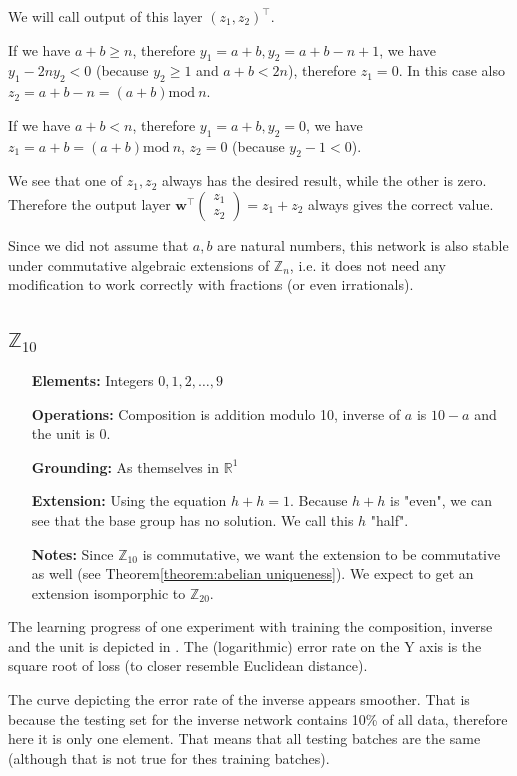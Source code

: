 We will call output of this layer $(z_1,z_2)^\top$. 

If we have $a+b\geq n$, therefore $y_1=a+b, y_2=a+b-n+1$, we have $y_1-2ny_2<0$ (because $y_2\geq 1$ and $a+b<2n$), therefore $z_1=0$. In this case also $z_2=a+b-n=(a+b)\text{mod}\ n$.

If we have $a+b< n$, therefore $y_1=a+b,y_2=0$, we have $z_1=a+b=(a+b)\text{mod}\ n$, $z_2=0$ (because $y_2-1<0$).

We see that one of $z_1,z_2$ always has the desired result, while the other is zero. Therefore the output layer $\textbf{w}^\top \left(\begin{matrix}
z_1\\
z_2
\end{matrix}\right)=z_1+z_2$ always gives the correct value.

Since we did not assume that $a,b$ are natural numbers, this network is also stable under commutative algebraic extensions of $\mathbb{Z}_n$, i.e. it does not need any modification to work correctly with fractions (or even irrationals).
\subsection{$\mathbb{Z}_{10}$}

\begin{itemize}
	\item[\textbf{Elements:}] Integers $0,1,2,\dots,9$
	\item[\textbf{Operations:}] Composition is addition modulo 10, inverse of $a$ is $10-a$ and the unit is 0.
	\item[\textbf{Grounding:}] As themselves in $\mathbb{R}^1$
	\item[\textbf{Extension:}] Using the equation $h+h=1$. Because $h+h$ is "even", we can see that the base group has no solution. We call this $h$ "half".
	\item[\textbf{Notes:}] Since $\mathbb{Z}_{10}$ is commutative, we want the extension to be commutative as well (see Theorem\autoref{theorem:abelian uniqueness}). We expect to get an extension isomporphic to $\mathbb{Z}_{20}$.
\end{itemize}

The learning progress of one experiment with training the composition, inverse and the unit is depicted in . The (logarithmic) error rate on the Y axis is the square root of loss (to closer resemble Euclidean distance).

The curve depicting the error rate of the inverse appears smoother. That is because the testing set for the inverse network contains 10\% of all data, therefore here it is only one element. That means that all testing batches are the same (although that is not true for thes training batches).


